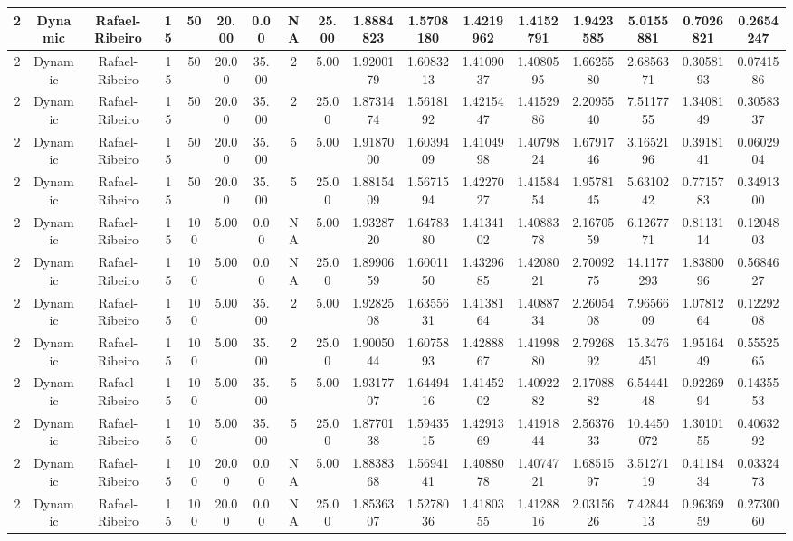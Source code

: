 \begin{longtable}{ | c | c | c | c | c | c | c | c | c | c | c | c | c | c | c | c | c | }
	\hline
	2	&	Dynamic	&	Rafael-Ribeiro	&	15	&	50	&	20.00	&	0.00	&	NA	&	25.00	&	1.8884823	&	1.5708180	&	1.4219962	&	1.4152791	&	1.9423585	&	5.0155881	&	0.7026821	&	0.2654247 \\
	\hline
	2	&	Dynamic	&	Rafael-Ribeiro	&	15	&	50	&	20.00	&	35.00	&	2	&	5.00	&	1.9200179	&	1.6083213	&	1.4109037	&	1.4080595	&	1.6625580	&	2.6856371	&	0.3058193	&	0.0741586 \\
	\hline
	2	&	Dynamic	&	Rafael-Ribeiro	&	15	&	50	&	20.00	&	35.00	&	2	&	25.00	&	1.8731474	&	1.5618192	&	1.4215447	&	1.4152986	&	2.2095540	&	7.5117755	&	1.3408149	&	0.3058337 \\
	\hline
	2	&	Dynamic	&	Rafael-Ribeiro	&	15	&	50	&	20.00	&	35.00	&	5	&	5.00	&	1.9187000	&	1.6039409	&	1.4104998	&	1.4079824	&	1.6791746	&	3.1652196	&	0.3918141	&	0.0602904 \\
	\hline
	2	&	Dynamic	&	Rafael-Ribeiro	&	15	&	50	&	20.00	&	35.00	&	5	&	25.00	&	1.8815409	&	1.5671594	&	1.4227027	&	1.4158454	&	1.9578145	&	5.6310242	&	0.7715783	&	0.3491300 \\
	\hline
	2	&	Dynamic	&	Rafael-Ribeiro	&	15	&	100	&	5.00	&	0.00	&	NA	&	5.00	&	1.9328720	&	1.6478380	&	1.4134102	&	1.4088378	&	2.1670559	&	6.1267771	&	0.8113114	&	0.1204803 \\
	\hline
	2	&	Dynamic	&	Rafael-Ribeiro	&	15	&	100	&	5.00	&	0.00	&	NA	&	25.00	&	1.8990659	&	1.6001150	&	1.4329685	&	1.4208021	&	2.7009275	&	14.1177293	&	1.8380096	&	0.5684627 \\
	\hline
	2	&	Dynamic	&	Rafael-Ribeiro	&	15	&	100	&	5.00	&	35.00	&	2	&	5.00	&	1.9282508	&	1.6355631	&	1.4138164	&	1.4088734	&	2.2605408	&	7.9656609	&	1.0781264	&	0.1229208 \\
	\hline
	2	&	Dynamic	&	Rafael-Ribeiro	&	15	&	100	&	5.00	&	35.00	&	2	&	25.00	&	1.9005044	&	1.6075893	&	1.4288867	&	1.4199880	&	2.7926892	&	15.3476451	&	1.9516449	&	0.5552565 \\
	\hline
	2	&	Dynamic	&	Rafael-Ribeiro	&	15	&	100	&	5.00	&	35.00	&	5	&	5.00	&	1.9317707	&	1.6449416	&	1.4145202	&	1.4092282	&	2.1708882	&	6.5444148	&	0.9226994	&	0.1435553 \\
	\hline
	2	&	Dynamic	&	Rafael-Ribeiro	&	15	&	100	&	5.00	&	35.00	&	5	&	25.00	&	1.8770138	&	1.5943515	&	1.4291369	&	1.4191844	&	2.5637633	&	10.4450072	&	1.3010155	&	0.4063292 \\
	\hline
	2	&	Dynamic	&	Rafael-Ribeiro	&	15	&	100	&	20.00	&	0.00	&	NA	&	5.00	&	1.8838368	&	1.5694141	&	1.4088078	&	1.4074721	&	1.6851597	&	3.5127119	&	0.4118434	&	0.0332473 \\
	\hline
	2	&	Dynamic	&	Rafael-Ribeiro	&	15	&	100	&	20.00	&	0.00	&	NA	&	25.00	&	1.8536307	&	1.5278036	&	1.4180355	&	1.4128816	&	2.0315626	&	7.4284413	&	0.9636959	&	0.2730060 \\

\end{longtable}
